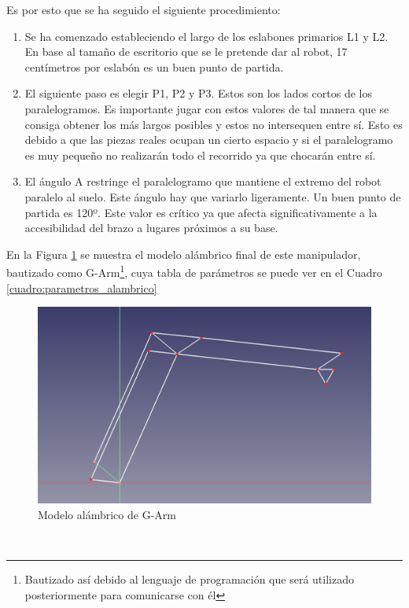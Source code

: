 \noindent Es por esto que se ha seguido el siguiente procedimiento: 
\newpage
\begin{enumerate}
\item Se ha comenzado estableciendo el largo de los eslabones primarios L1 y L2. En base al tamaño de escritorio que se le pretende 
dar al robot, 17 centímetros por eslabón es un buen punto de partida.
\item El siguiente paso es elegir P1, P2 y P3. Estos son los lados cortos de los paralelogramos. Es importante jugar con estos valores 
de tal manera que se consiga obtener los más largos posibles y estos no intersequen entre sí. Esto es debido a que las piezas reales ocupan un cierto espacio y si el paralelogramo es 
muy pequeño no realizarán todo el recorrido ya que chocarán entre sí. 
\item El ángulo A restringe el paralelogramo que mantiene el extremo del robot paralelo al suelo. Este ángulo hay que variarlo ligeramente. Un buen 
punto de partida es 120º. Este valor es crítico ya que afecta significativamente a la accesibilidad del brazo a lugares próximos a su base. 
\end{enumerate}
\newpage
En la Figura \ref{fig:g_arm_alambrico} se muestra el modelo alámbrico final de este manipulador, bautizado como G-Arm\footnote{Bautizado así 
debido al lenguaje de programación que será utilizado posteriormente para comunicarse con él}, cuya tabla de parámetros se puede 
ver en el Cuadro \ref{cuadro:parametros_alambrico}\\
\begin{figure} [ht!]
  \begin{center}
    \includegraphics[width=15cm]{figs/alambrico_garm.png}
  \end{center}
  \caption{Modelo alámbrico de G-Arm}
  \label{fig:g_arm_alambrico}
\end{figure}\ 

